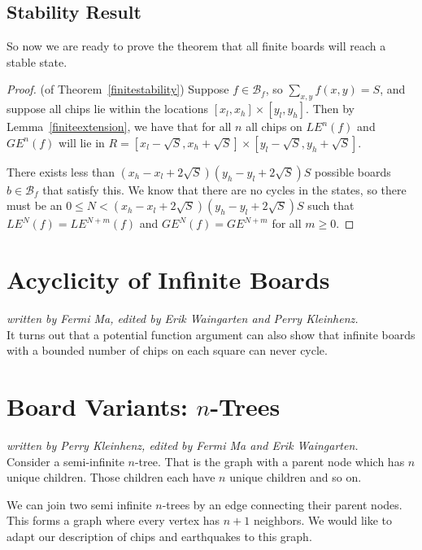 \documentclass[runningheads,a4paper]{llncs}
\begin{document}
\subsection{Stability Result}
So now we are ready to prove the theorem that all finite boards will reach a stable state. 

\begin{proof}
(of Theorem~\ref{finitestability}) Suppose $f \in \mathcal{B}_f$, so $\sum_{x,y} f(x,y) = S$, and suppose all chips lie within the locations $[x_l, x_h] \times [y_l, y_h]$. Then by Lemma~\ref{finiteextension}, we have that for all $n$ all chips on $LE^n(f)$ and $GE^n(f)$ will lie in $R = [x_l - \sqrt{S}, x_h + \sqrt{S}] \times [y_l - \sqrt{S}, y_h + \sqrt{S}]$. 

There exists less than $(x_h - x_l + 2\sqrt{S})(y_h - y_l + 2\sqrt{S})S$ possible boards $b \in \mathcal{B}_f$ that satisfy this. We know that there are no cycles in the states, so there must be an $0 \leq N < (x_h - x_l + 2\sqrt{S})(y_h - y_l + 2\sqrt{S})S$ such that $LE^N(f) = LE^{N+m}(f)$ and $GE^N(f)=GE^{N+m}$ for all $m \geq 0$.
\end{proof}

\section{Acyclicity of Infinite Boards}
\label{Acyclicity of Infinite Boards}

\emph{written by Fermi Ma, edited by Erik Waingarten and Perry Kleinhenz.}\\

It turns out that a potential function argument can also show that infinite boards with a bounded number of chips on each square can never cycle.


\section{Board Variants: $n$-Trees}
\label{Board Variants: n-Trees}
\emph{written by Perry Kleinhenz, edited by Fermi Ma and Erik Waingarten.}\\

Consider a semi-infinite $n$-tree. That is the graph with a parent node which has $n$ unique children. Those children each have $n$ unique children and so on. 

We can join two semi infinite $n$-trees by an edge connecting their parent nodes. This forms a graph where every vertex has $n+1$ neighbors. We would like to adapt our description of chips and earthquakes to this graph. 
\end{document}
